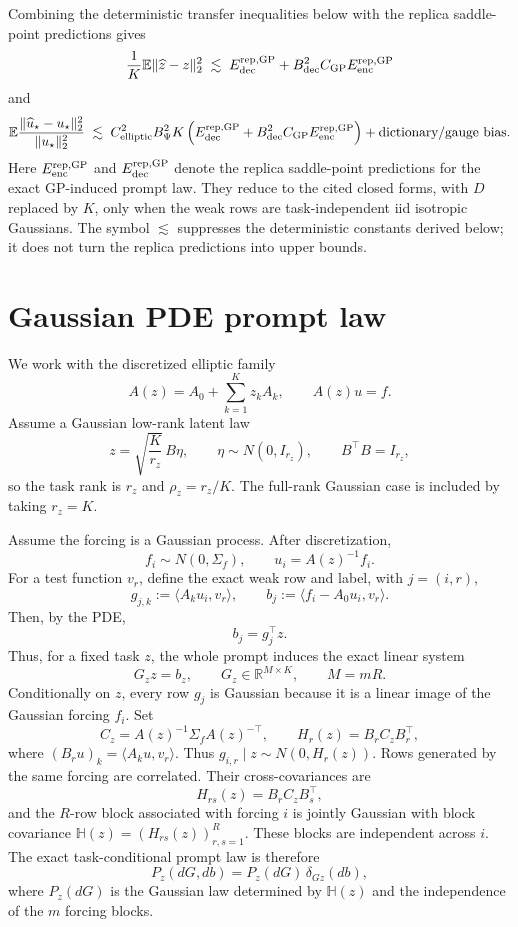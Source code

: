 \documentclass[11pt,a4paper]{article}
\theoremstyle{definition}
\newcommand{\R}{\mathbb R}
\newcommand{\E}{\mathbb E}
\newcommand{\wh}{\widehat}
\begin{document}
Combining the deterministic transfer inequalities below with the replica
saddle-point predictions gives
\[
    \frac1K\E\|\wh z-z\|_2^2
    \;\lesssim\;
    E_{\rm dec}^{\rm rep,GP}
    +
    B_{\rm dec}^2 C_{\rm GP}
    E_{\rm enc}^{\rm rep,GP}
\]
and
\[
    \E\frac{\|\wh u_\star-u_\star\|_2^2}{\|u_\star\|_2^2}
    \;\lesssim\;
    C_{\rm elliptic}^2 B_\Psi^2K
    \left(
    E_{\rm dec}^{\rm rep,GP}
    +
    B_{\rm dec}^2 C_{\rm GP}
    E_{\rm enc}^{\rm rep,GP}
    \right)
    +\text{dictionary/gauge bias}.
\]
Here $E_{\rm enc}^{\rm rep,GP}$ and $E_{\rm dec}^{\rm rep,GP}$ denote the
replica saddle-point predictions for the exact GP-induced prompt law.  They
reduce to the cited closed forms, with $D$ replaced by $K$, only when the
weak rows are task-independent iid isotropic Gaussians. The symbol \(\lesssim\)
suppresses the deterministic constants derived below; it does not turn the
replica predictions into upper bounds.

\section{Gaussian PDE prompt law}

We work with the discretized elliptic family
\[
    A(z)=A_0+\sum_{k=1}^{K} z_kA_k,
    \qquad
    A(z)u=f.
\]
Assume a Gaussian low-rank latent law
\[
    z=\sqrt{\frac{K}{r_z}}\,B\eta,
    \qquad
    \eta\sim N(0,I_{r_z}),
    \qquad
    B^\top B=I_{r_z},
\]
so the task rank is $r_z$ and $\rho_z=r_z/K$.  The full-rank Gaussian case is
included by taking $r_z=K$.

Assume the forcing is a Gaussian process.  After discretization,
\[
    f_i\sim N(0,\Sigma_f),
    \qquad
    u_i=A(z)^{-1}f_i .
\]
For a test function $v_r$, define the exact weak row and label, with
$j=(i,r)$,
\[
    g_{j,k}:=\langle A_ku_i,v_r\rangle,
    \qquad
    b_j:=\langle f_i-A_0u_i,v_r\rangle .
\]
Then, by the PDE,
\[
    b_j=g_j^\top z .
\]
Thus, for a fixed task $z$, the whole prompt induces the exact linear system
\[
    G_z z=b_z,
    \qquad
    G_z\in\R^{M\times K},
    \qquad
    M=mR.
\]
Conditionally on $z$, every row $g_j$ is Gaussian because it is a linear image
of the Gaussian forcing $f_i$.  Set
\[
    C_z=A(z)^{-1}\Sigma_fA(z)^{-\top},
    \qquad
    H_r(z)
    =
    B_rC_zB_r^\top,
\]
where $(B_ru)_k=\langle A_ku,v_r\rangle$.
Thus \(g_{i,r}\mid z\sim N(0,H_r(z))\). Rows generated by the same forcing
are correlated. Their cross-covariances are
\[
    H_{rs}(z)=B_rC_zB_s^\top,
\]
and the \(R\)-row block associated with forcing \(i\) is jointly Gaussian
with block covariance \(\mathbb H(z)=(H_{rs}(z))_{r,s=1}^R\). These blocks
are independent across \(i\).
The exact task-conditional prompt law is therefore
\[
    P_z(dG,db)
    =
    P_z(dG)\,
    \delta_{Gz}(db),
\]
where $P_z(dG)$ is the Gaussian law determined by \(\mathbb H(z)\) and the
independence of the \(m\) forcing blocks.
\end{document}
